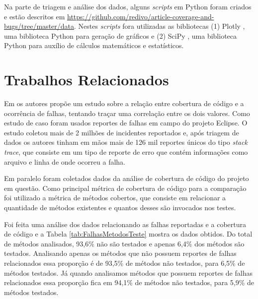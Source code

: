 \documentclass[11.5pt]{article}
\begin{document}
Na parte de triagem e análise dos dados, alguns \textit{scripts} em Python foram criados e estão
descritos em \url{https://github.com/redivo/article-coverage-and-bugs/tree/master/data}.
Nestes \textit{scripts} fora utilizadas as bibliotecas
(1) Plotly \cite{plotly}, uma biblioteca Python para geração de gráficos e (2) SciPy \cite{scipy},
uma biblioteca Python para auxílio de cálculos matemáticos e estatísticos.



\section{Trabalhos Relacionados}

Em \cite{unitTestedCrash} os autores propõe um estudo sobre a relação entre cobertura de código
e a ocorrência de falhas, tentando traçar uma correlação entre os dois valores.
Como estudo de caso foram usados reportes de falhas em campo do projeto Eclipse.
O estudo coletou mais de 2 milhões de incidentes reportados e, após triagem de dados os autores
tinham em mãos mais de 126 mil reportes únicos do tipo \textit{stack trace}, que consiste em um tipo
de reporte de erro que contém informações como arquivo e linha de onde ocorreu a falha.

Em paralelo foram coletados dados da análise de cobertura de código do projeto em questão.
Como principal métrica de cobertura de código para a comparação foi utilizado a métrica de métodos
cobertos, que consiste em relacionar a quantidade de métodos existentes e quantos desses são
invocados nos testes.

Foi feita uma análise dos dados relacionando as falhas reportadas e a cobertura de código e a Tabela
\ref{tab:FalhasMetodosTeste} mostra os dados obtidos.
Do total de métodos analisados, 93,6\% não são testados e apenas 6,4\% dos métodos são testados.
Analisando apenas os métodos que não possuem reportes de falhas relacionados essa proporção é de
93,5\% de métodos não testados, para 6,5\% de métodos testados.
Já quando analisamos métodos que possuem reportes de falhas relacionados essa proporção fica em
94,1\% de métodos não testados, para 5,9\% de métodos testados.
\end{document}
